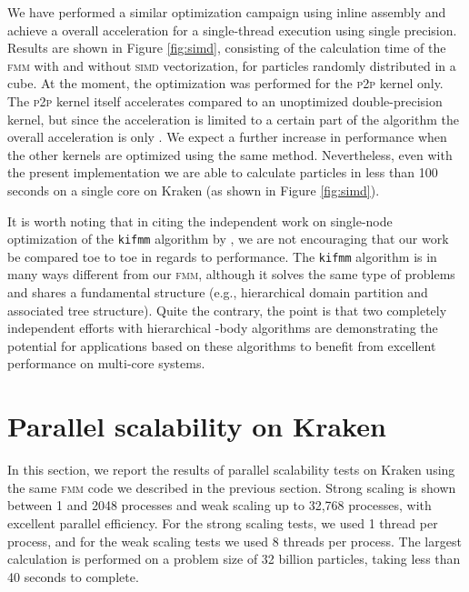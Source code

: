 \documentclass[10pt,twocolumn]{article}
\newcommand{\fmm}{\textsc{fmm}\xspace}
\newcommand{\simd}{\textsc{simd}\xspace}
\newcommand{\PP}{\textsc{p}2\textsc{p}\xspace}
\newlength{\up}
\begin{document}
We have performed a similar optimization campaign using inline assembly and achieve a  overall acceleration for a single-thread execution using single precision. Results are shown in Figure \ref{fig:simd}, consisting of the calculation time of the \fmm with and without \simd vectorization, for  particles randomly distributed in a cube. At the moment, the optimization was performed for the \PP kernel only. The \PP kernel itself accelerates  compared to an unoptimized double-precision kernel, but since the acceleration is limited to a certain part of the algorithm the overall acceleration is only . We expect a further increase in performance when the other kernels are optimized using the same method. Nevertheless, even with the present implementation we are able to calculate  particles in less than 100 seconds on a single core on Kraken (as shown in Figure \ref{fig:simd}).

It is worth noting that in citing the independent work on single-node optimization of the \texttt{kifmm} algorithm by \cite{ChandramowlishwaranETal2010}, we are not encouraging that our work be compared toe to toe in regards to performance. The \texttt{kifmm} algorithm is in many ways different from our \fmm, although it solves the same type of problems and shares a fundamental structure (e.g., hierarchical domain partition and associated tree structure). Quite the contrary, the point is that two completely independent efforts with hierarchical -body algorithms are demonstrating the potential for applications based on these algorithms to benefit from excellent performance on multi-core systems.

\section{Parallel scalability on Kraken}  
 

In this section, we report the results of parallel scalability tests on Kraken using the same \fmm code we described in the previous section.  Strong scaling is shown between 1 and 2048 processes and weak scaling up to 32,768 processes, with excellent parallel efficiency. For the strong scaling tests, we used 1 thread per process, and for the weak scaling tests we used 8 threads per process. The largest calculation is performed on a problem size of 32 billion particles, taking less than 40 seconds to complete.
\end{document}
